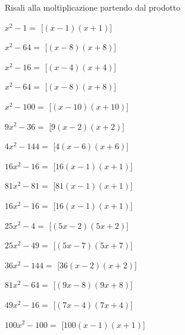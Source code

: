 \begin{esercizio}
 \label{ese:11.11}
Risali alla moltiplicazione partendo dal prodotto

\begin{multicols}{2}
\begin{enumeratea}
\spazielenx
\item \(x^{2} - 1=\) 
\hfill [\(\left(x - 1\right) \left(x + 1\right)\)]
\item \(x^{2} - 64=\) 
\hfill [\(\left(x - 8\right) \left(x + 8\right)\)]
\item \(x^{2} - 16=\) 
\hfill [\(\left(x - 4\right) \left(x + 4\right)\)]
\item \(x^{2} - 64=\) 
\hfill [\(\left(x - 8\right) \left(x + 8\right)\)]
\item \(x^{2} - 100=\) 
\hfill [\(\left(x - 10\right) \left(x + 10\right)\)]
\item \(9 x^{2} - 36=\) 
\hfill [\(9 \left(x - 2\right) \left(x + 2\right)\)]
\item \(4 x^{2} - 144=\) 
\hfill [\(4 \left(x - 6\right) \left(x + 6\right)\)]
\item \(16 x^{2} - 16=\) 
\hfill [\(16 \left(x - 1\right) \left(x + 1\right)\)]
\item \(81 x^{2} - 81=\) 
\hfill [\(81 \left(x - 1\right) \left(x + 1\right)\)]
\item \(16 x^{2} - 16=\) 
\hfill [\(16 \left(x - 1\right) \left(x + 1\right)\)]
\item \(25 x^{2} - 4=\) 
\hfill [\(\left(5 x - 2\right) \left(5 x + 2\right)\)]
\item \(25 x^{2} - 49=\) 
\hfill [\(\left(5 x - 7\right) \left(5 x + 7\right)\)]
\item \(36 x^{2} - 144=\) 
\hfill [\(36 \left(x - 2\right) \left(x + 2\right)\)]
\item \(81 x^{2} - 64=\) 
\hfill [\(\left(9 x - 8\right) \left(9 x + 8\right)\)]
\item \(49 x^{2} - 16=\) 
\hfill [\(\left(7 x - 4\right) \left(7 x + 4\right)\)]
\item \(100 x^{2} - 100=\) 
\hfill [\(100 \left(x - 1\right) \left(x + 1\right)\)]

\end{enumeratea}
\end{multicols}
\end{esercizio}
